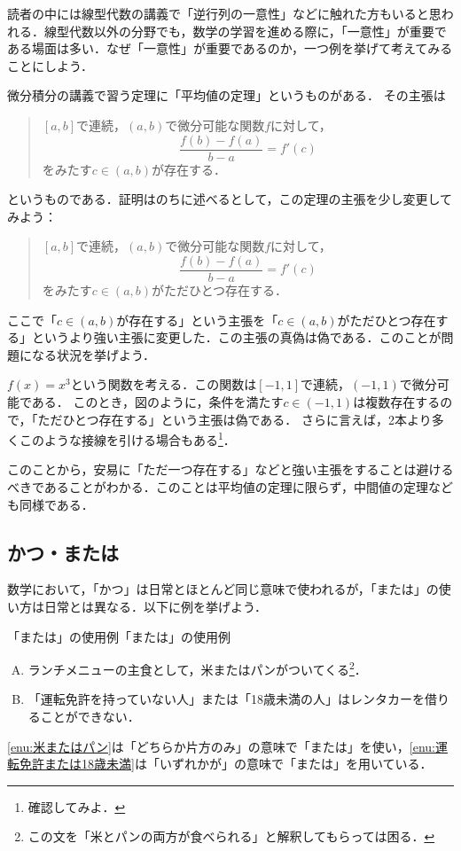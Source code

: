 読者の中には線型代数の講義で「逆行列の一意性」などに触れた方もいると思われる．線型代数以外の分野でも，数学の学習を進める際に，「一意性」が重要である場面は多い．なぜ「一意性」が重要であるのか，一つ例を挙げて考えてみることにしよう．

微分積分の講義で習う定理に「平均値の定理」というものがある．
その主張は
\begin{quotation}
  $[a,b]$で連続，$(a,b)$で微分可能な関数$f$に対して，
  \[
    \frac{f(b)-f(a)}{b-a}=f'(c)
  \]
  をみたす$ c \in (a,b)$が存在する．
\end{quotation}

というものである．証明はのちに述べるとして，この定理の主張を少し変更してみよう：

\begin{quotation}
  $[a,b]$で連続，$(a,b)$で微分可能な関数$f$に対して，
  \[
    \frac{f(b)-f(a)}{b-a}=f'(c)
  \]
  をみたす$ c \in (a,b)$がただひとつ存在する．
\end{quotation}


ここで「$c \in (a,b)$が存在する」という主張を「$c \in (a,b)$がただひとつ存在する」というより強い主張に変更した．この主張の真偽は偽である．このことが問題になる状況を挙げよう．

$f(x)=x^3$という関数を考える．この関数は$[-1,1]$で連続，$(-1,1)$で微分可能である．
このとき，図のように，条件を満たす$c \in (-1,1)$は複数存在するので，「ただひとつ存在する」という主張は偽である．
さらに言えば，2本より多くこのような接線を引ける場合もある\footnote{確認してみよ．}．

このことから，安易に「ただ一つ存在する」などと強い主張をすることは避けるべきであることがわかる．このことは平均値の定理に限らず，中間値の定理なども同様である．


\subsection{かつ・または}

数学において，「かつ」は日常とほとんど同じ意味で使われるが，「または」の使い方は日常とは異なる．以下に例を挙げよう．

\begin{example}{「または」の使用例}{「または」の使用例}
  \begin{enumerate}[(A)]
    \item ランチメニューの主食として，米またはパンがついてくる\footnote{この文を「米とパンの両方が食べられる」と解釈してもらっては困る．}．\label{enu:米またはパン}
    \item 「運転免許を持っていない人」または「18歳未満の人」はレンタカーを借りることができない． \label{enu:運転免許または18歳未満}
  \end{enumerate}
  \ref{enu:米またはパン}は「どちらか片方のみ」の意味で「または」を使い，\ref{enu:運転免許または18歳未満}は「いずれかが」の意味で「または」を用いている．
\end{example}

